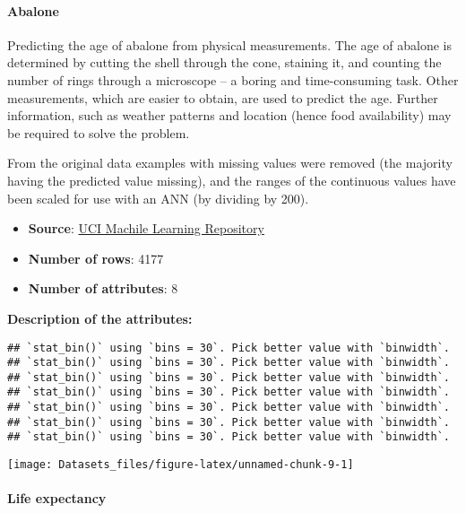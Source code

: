 \documentclass[]{article}
\providecommand{\tightlist}{%
  \setlength{\itemsep}{0pt}\setlength{\parskip}{0pt}}
\let\oldparagraph\paragraph
\renewcommand{\paragraph}[1]{\oldparagraph{#1}\mbox{}}
\begin{document}
\hypertarget{abalone}{%
\paragraph{Abalone}\label{abalone}}

Predicting the age of abalone from physical measurements. The age of
abalone is determined by cutting the shell through the cone, staining
it, and counting the number of rings through a microscope -- a boring
and time-consuming task. Other measurements, which are easier to obtain,
are used to predict the age. Further information, such as weather
patterns and location (hence food availability) may be required to solve
the problem.

From the original data examples with missing values were removed (the
majority having the predicted value missing), and the ranges of the
continuous values have been scaled for use with an ANN (by dividing by
200).

\begin{itemize}
\tightlist
\item
  \textbf{Source}:
  \href{http://archive.ics.uci.edu/ml/datasets/Abalone}{UCI Machile
  Learning Repository}
\item
  \textbf{Number of rows}: 4177
\item
  \textbf{Number of attributes}: 8
\end{itemize}

\textbf{Description of the attributes:}

\begin{verbatim}
## `stat_bin()` using `bins = 30`. Pick better value with `binwidth`.
## `stat_bin()` using `bins = 30`. Pick better value with `binwidth`.
## `stat_bin()` using `bins = 30`. Pick better value with `binwidth`.
## `stat_bin()` using `bins = 30`. Pick better value with `binwidth`.
## `stat_bin()` using `bins = 30`. Pick better value with `binwidth`.
## `stat_bin()` using `bins = 30`. Pick better value with `binwidth`.
## `stat_bin()` using `bins = 30`. Pick better value with `binwidth`.
\end{verbatim}

\texttt{[image: Datasets\_files/figure-latex/unnamed-chunk-9-1]}

\hypertarget{life-expectancy}{%
\paragraph{Life expectancy}\label{life-expectancy}}
\end{document}
